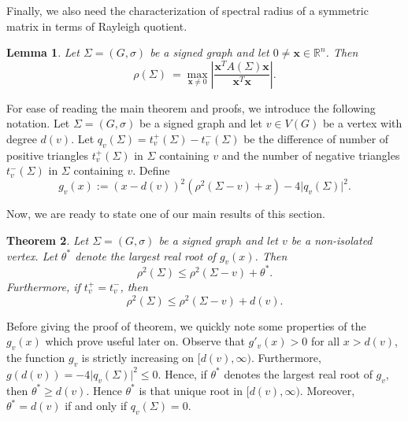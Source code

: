 \documentclass[12pt]{article}
\theoremstyle{plain}
\newtheorem{theorem}{Theorem}[section]
\newtheorem{lemma}[theorem]{Lemma}
\numberwithin{equation}{section}
\begin{document}
	Finally, we also need the characterization of spectral radius of a symmetric matrix in terms of Rayleigh quotient.
	
	\begin{lemma}\label{Spec_Rad_Rayleigh}
		Let $\Sigma=(G,\sigma)$ be a signed graph and let $0\neq \mathbf{x}\in\mathbb{R}^n$. Then
		\[
		\rho(\Sigma)\ = \max_{\mathbf{x} \neq 0} \left|
		\frac{\mathbf{x}^{T}A(\Sigma)\mathbf{x}}
		{\mathbf{x}^{T}\mathbf{x}}
		\right|.
		\]
	\end{lemma}
	
	For ease of reading the main theorem and proofs, we introduce the following notation. Let $\Sigma=(G,\sigma)$ be a signed graph and let $v\in V(G)$ be a
	vertex with degree $d(v)$. Let $q_v(\Sigma)=t_v^+(\Sigma)-t_v^-(\Sigma)$ be the difference of number of positive triangles $t_v^+(\Sigma)$ in $\Sigma$ containing $v$ and the number of negative triangles $t_v^-(\Sigma)$ in $\Sigma$ containing $v$. Define 
	\[g_v(x):=(x-d(v))^2(\rho^2(\Sigma-v)+x) -4\vert q_v(\Sigma) \vert ^2.\]
	
	Now, we are ready to state one of our main results of this section. 
	\begin{theorem}\label{Spec_Rad_Theta}
		Let $\Sigma=(G,\sigma)$ be a signed graph and let $v$ be a non-isolated vertex. Let $\theta^{*}$ denote the largest real root of $g_v(x)$.
		Then
		\[
		\rho^{2}(\Sigma)\leq \rho^{2}(\Sigma-v)+\theta^{*}.
		\]
		Furthermore, if $t_v^+=t_v^-$, then
		\[
		\rho^{2}(\Sigma)\leq \rho^{2}(\Sigma-v)+d(v).
		\]
	\end{theorem}
	
	Before giving the proof of theorem, we quickly note some properties of the $g_v(x)$ which prove useful later on. Observe that $g'_v(x)>0$ for all $x>d(v)$, the function $g_v$ is strictly increasing on $[d(v),\infty)$. Furthermore, $g(d(v))=-4\vert q_v(\Sigma)\vert^2\le 0.$
	Hence, if $\theta^*$ denotes the largest real root of $g_v$, then $\theta^*\ge d(v)$. Hence
	$\theta^{*}$ is that unique root in $[d(v),\infty)$. Moreover, $\theta^*=d(v)$ if and only if $q_v(\Sigma)=0.$ 
	
\end{document}
